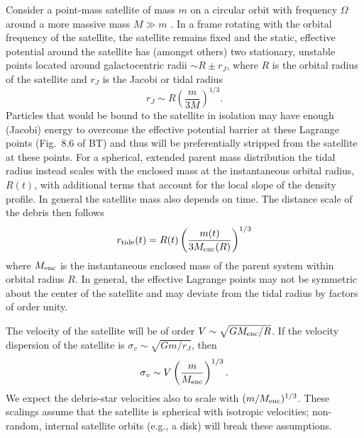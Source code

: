 \documentclass[letterpaper,12pt,preprint]{aastex}
\begin{document}
Consider a point-mass satellite of mass $m$ on a circular orbit with frequency $\Omega$ around a more massive mass $M\gg m$ \citep[the ``restricted three-body problem''; e.g., \S 8.3][]{binneytremaine}. In a frame rotating with the orbital frequency of the satellite, the satellite remains fixed and the static, effective potential around the satellite has (amongst others) two stationary, unstable points located around galactocentric radii $\sim R \pm r_J$, where $R$ is the orbital radius of the satellite and $r_J$ is the Jacobi or tidal radius
\begin{equation}
	r_J \sim R\left(\frac{m}{3M}\right)^{1/3}.\label{eq:ptmass}
\end{equation}
Particles that would be bound to the satellite in isolation may have enough (Jacobi) energy to overcome the effective potential barrier at these Lagrange points (Fig.~8.6 of BT) and thus will be preferentially stripped from the satellite at these points. For a spherical, extended parent mass distribution the tidal radius instead scales with the enclosed mass at the instantaneous orbital radius, $R(t)$, with additional terms that account for the local slope of the density profile. In general the satellite mass also depends on time. The distance scale of the debris then follows
\begin{equation}
	r_{\rm tide}(t) = R(t)\left(\frac{m(t)}{3M_{\rm enc}(R)}\right)^{1/3}\label{eq:tidalradius}
\end{equation}
where $M_{\rm enc}$ is the instantaneous enclosed mass of the parent system within orbital radius $R$.
In general, the effective Lagrange points may not be symmetric about the center of the satellite and may deviate from the tidal radius by factors of order unity. 

The velocity of the satellite will be of order $V\sim \sqrt{GM_{\rm enc}/R}$. If the velocity dispersion of the satellite is $\sigma_v \sim \sqrt{Gm/r_J}$, then
\begin{equation}
	\sigma_v \sim V\left(\frac{m}{M_{\rm enc}}\right)^{1/3}\label{eq:velscale}.
\end{equation}
We expect the debris-star velocities also to scale with $(m/M_{\rm enc})^{1/3}$. These scalings assume that the satellite is spherical with isotropic velocities; non-random, internal satellite orbits (e.g., a disk) will break these assumptions. 
\end{document}
